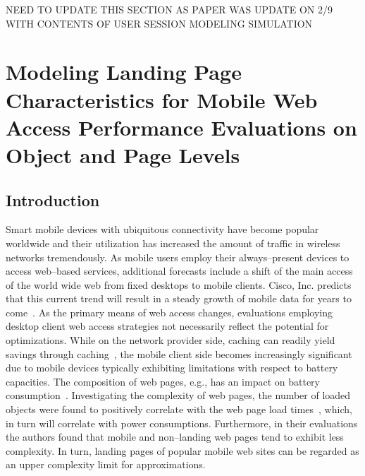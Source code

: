 





NEED TO UPDATE THIS SECTION AS PAPER WAS UPDATE ON 2/9 WITH CONTENTS OF USER SESSION MODELING SIMULATION



\chapter{Modeling Landing Page Characteristics for
Mobile Web Access Performance Evaluations on
Object and Page Levels}

\section*{Introduction}
Smart mobile devices with ubiquitous connectivity have become popular worldwide and their utilization has increased the amount of traffic in wireless networks tremendously. 
As mobile users employ their always--present devices to access web--based services, additional forecasts include a shift of the main access of the world wide web from fixed desktops to mobile clients. 
Cisco, Inc. predicts that this current trend will result in a steady growth of mobile data for years to come~\cite{VNI14}.
As the primary means of web access changes, evaluations employing desktop client web access strategies not necessarily reflect the potential for optimizations.
While on the network provider side, caching can readily yield savings through caching~\cite{IhPa11}, the mobile client side becomes increasingly significant due to mobile devices typically exhibiting limitations with respect to battery capacities.
The composition of web pages, e.g., has an impact on battery consumption~\cite{ThAgNiBoSi12}.
Investigating the complexity of web pages, the number of loaded objects were found to positively correlate with the web page load times~\cite{BuMaSe13}, which, in turn will correlate with power consumptions.
Furthermore, in their evaluations the authors found that mobile and non--landing web pages tend to exhibit less complexity. 
In turn, landing pages of popular mobile web sites can be regarded as an upper complexity limit for approximations.


